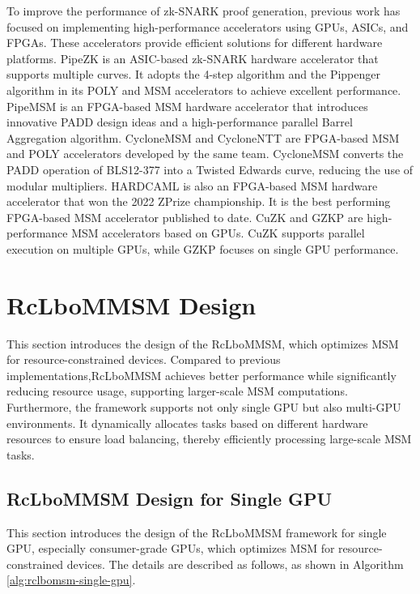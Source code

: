 \documentclass[conference]{IEEEtran}
\begin{document}
To improve the performance of zk-SNARK proof generation, previous work has focused on implementing high-performance accelerators using GPUs, ASICs, and FPGAs. These accelerators provide efficient solutions for different hardware platforms. PipeZK is an ASIC-based zk-SNARK hardware accelerator that supports multiple curves. It adopts the 4-step algorithm and the Pippenger algorithm in its POLY and MSM accelerators to achieve excellent performance. PipeMSM is an FPGA-based MSM hardware accelerator that introduces innovative PADD design ideas and a high-performance parallel Barrel Aggregation algorithm. CycloneMSM and CycloneNTT are FPGA-based MSM and POLY accelerators developed by the same team. CycloneMSM converts the PADD operation of BLS12-377 into a Twisted Edwards curve, reducing the use of modular multipliers. HARDCAML is also an FPGA-based MSM hardware accelerator that won the 2022 ZPrize championship. It is the best performing FPGA-based MSM accelerator published to date. CuZK and GZKP are high-performance MSM accelerators based on GPUs. CuZK supports parallel execution on multiple GPUs, while GZKP focuses on single GPU performance.

\section{RcLboMMSM Design}
\label{RcLboMMSM Design}
This section introduces the design of the RcLboMMSM, which optimizes MSM for resource-constrained devices. Compared to previous implementations,RcLboMMSM achieves better performance while significantly reducing resource usage, supporting larger-scale MSM computations. Furthermore, the framework supports not only single GPU but also multi-GPU environments. It dynamically allocates tasks based on different hardware resources to ensure load balancing, thereby efficiently processing large-scale MSM tasks.
\subsection{RcLboMMSM Design for Single GPU}
This section introduces the design of the RcLboMMSM framework for single GPU, especially consumer-grade GPUs, which optimizes MSM for resource-constrained devices. The details are described as follows, as shown in Algorithm \ref{alg:rclbomsm-single-gpu}.
\end{document}
